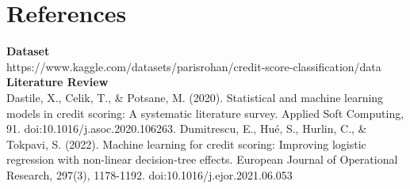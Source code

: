 \documentclass[twocolumn]{article}
\begin{document}
\section*{References}
\textbf{Dataset}\\
https://www.kaggle.com/datasets/parisrohan/credit-score-classification/data
\vspace{5mm}\newline
\textbf{Literature Review}\\
Dastile, X., Celik, T., \& Potsane, M. (2020).
Statistical and machine learning models in credit scoring: A systematic literature survey.
Applied Soft Computing, 91. doi:10.1016/j.asoc.2020.106263.
\vspace{5mm}\newline
Dumitrescu, E., Hué, S., Hurlin, C., \& Tokpavi, S. (2022). 
Machine learning for credit scoring: Improving logistic regression 
with non-linear decision-tree effects. European Journal of Operational 
Research, 297(3), 1178-1192. doi:10.1016/j.ejor.2021.06.053
\end{document}

